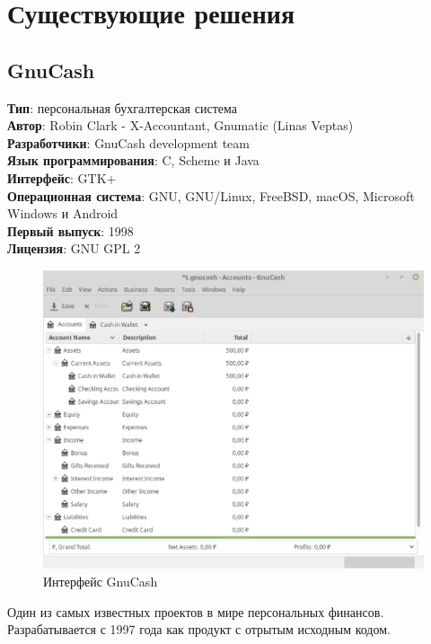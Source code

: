 \section{Существующие решения}
\subsection{GnuCash}

\textbf{Тип}: персональная бухгалтерская система\\
\textbf{Автор}: Robin Clark - X-Accountant,
Gnumatic (Linas Veptas)\\
\textbf{Разработчики}: GnuCash development team\\
\textbf{Язык программирования}: C, Scheme и Java\\
\textbf{Интерфейс}: 	GTK+\\
\textbf{Операционная система}: GNU, GNU/Linux, FreeBSD, macOS, Microsoft Windows и Android\\
\textbf{Первый выпуск}: 1998\\
\textbf{Лицензия}: 	GNU GPL 2\\

\begin{figure}[H]
	\centering
	\includegraphics[width=1\linewidth]{pics/GnuCash.eps}
	\caption{Интерфейс GnuCash}
	\label{fig:GnuCash}
\end{figure}

Один из самых известных проектов в мире персональных финансов. Разрабатывается с 1997 года как продукт с отрытым исходным кодом.\\

